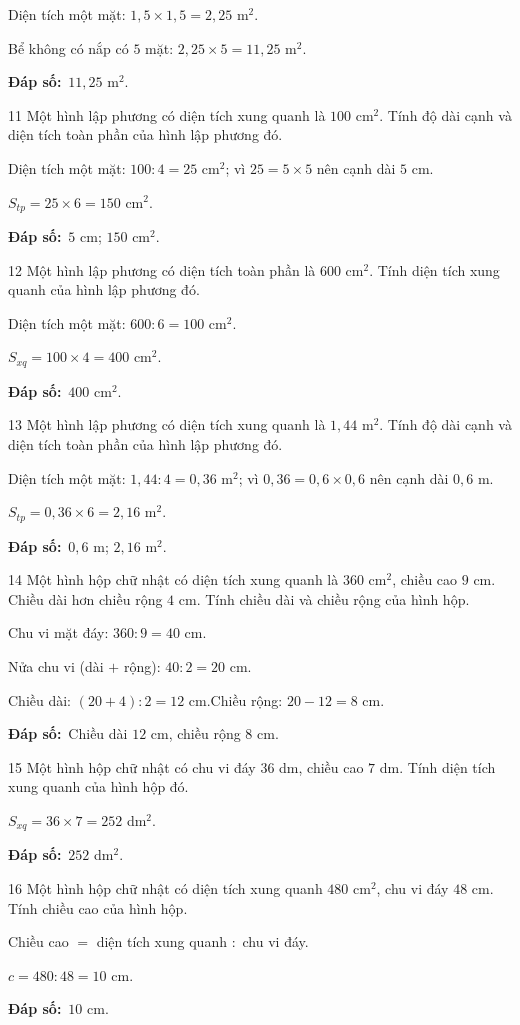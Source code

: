 \documentclass[11pt]{article}
\newif\ifsol \solfalse
\providecommand{\AnsWord}{Đáp số}
\newcommand{\dapso}[1]{\par\textbf{\AnsWord:}\ #1}
\newcommand{\probsol}[1]{%
  \begin{lrbox}{\solmeasure}\begin{minipage}{\dimexpr\linewidth-24pt\relax}#1\end{minipage}\end{lrbox}%
  \ifsol
    \begin{solbox}#1\end{solbox}%
  \else
    \setlength{\solht}{\dimexpr\ht\solmeasure+\dp\solmeasure+0.85cm\relax}%
    \ifdim\solht<1.35cm\setlength{\solht}{1.35cm}\fi
    \begin{tcolorbox}[colback=white,colframe=Line,boxrule=0.8pt,arc=5pt,
      left=8pt,right=8pt,top=4pt,bottom=4pt,height=\solht]{\footnotesize\color{Slate}\itshape\WorkWord}\end{tcolorbox}%
  \fi}
\newcommand{\gap}{\vspace{0.3cm}}
\def\WorkWord{Bài làm:}
\def\AnsWord{Đáp số}
\begin{document}
\probsol{
Diện tích một mặt: $1{,}5\times1{,}5=2{,}25$ m$^2$.\par
Bể không có nắp có $5$ mặt: $2{,}25\times5=11{,}25$ m$^2$.
\dapso{$11{,}25$ m$^2$.}}
\gap
\begin{probbox}{11}{\relax}
Một hình lập phương có diện tích xung quanh là $100$ cm$^2$. Tính độ dài cạnh và diện tích toàn phần của hình lập phương đó.
\end{probbox}
\probsol{
Diện tích một mặt: $100:4=25$ cm$^2$; vì $25=5\times5$ nên cạnh dài $5$ cm.\par
$S_{tp}=25\times6=150$ cm$^2$.
\dapso{$5$ cm; $150$ cm$^2$.}}
\gap
\begin{probbox}{12}{\relax}
Một hình lập phương có diện tích toàn phần là $600$ cm$^2$. Tính diện tích xung quanh của hình lập phương đó.
\end{probbox}
\probsol{
Diện tích một mặt: $600:6=100$ cm$^2$.\par
$S_{xq}=100\times4=400$ cm$^2$.
\dapso{$400$ cm$^2$.}}
\gap
\begin{probbox}{13}{\relax}
Một hình lập phương có diện tích xung quanh là $1{,}44$ m$^2$. Tính độ dài cạnh và diện tích toàn phần của hình lập phương đó.
\end{probbox}
\probsol{
Diện tích một mặt: $1{,}44:4=0{,}36$ m$^2$; vì $0{,}36=0{,}6\times0{,}6$ nên cạnh dài $0{,}6$ m.\par
$S_{tp}=0{,}36\times6=2{,}16$ m$^2$.
\dapso{$0{,}6$ m; $2{,}16$ m$^2$.}}
\gap
\begin{probbox}{14}{\relax}
Một hình hộp chữ nhật có diện tích xung quanh là $360$ cm$^2$, chiều cao $9$ cm. Chiều dài hơn chiều rộng $4$ cm. Tính chiều dài và chiều rộng của hình hộp.
\end{probbox}
\probsol{
Chu vi mặt đáy: $360:9=40$ cm.\par
Nửa chu vi (dài $+$ rộng): $40:2=20$ cm.\par
Chiều dài: $(20+4):2=12$ cm.\quad Chiều rộng: $20-12=8$ cm.
\dapso{Chiều dài $12$ cm, chiều rộng $8$ cm.}}
\gap
\begin{probbox}{15}{\relax}
Một hình hộp chữ nhật có chu vi đáy $36$ dm, chiều cao $7$ dm. Tính diện tích xung quanh của hình hộp đó.
\end{probbox}
\probsol{
$S_{xq}=36\times7=252$ dm$^2$.
\dapso{$252$ dm$^2$.}}
\gap
\begin{probbox}{16}{\relax}
Một hình hộp chữ nhật có diện tích xung quanh $480$ cm$^2$, chu vi đáy $48$ cm. Tính chiều cao của hình hộp.
\end{probbox}
\probsol{
Chiều cao $=$ diện tích xung quanh $:$ chu vi đáy.\par
$c=480:48=10$ cm.
\dapso{$10$ cm.}}
\end{document}

